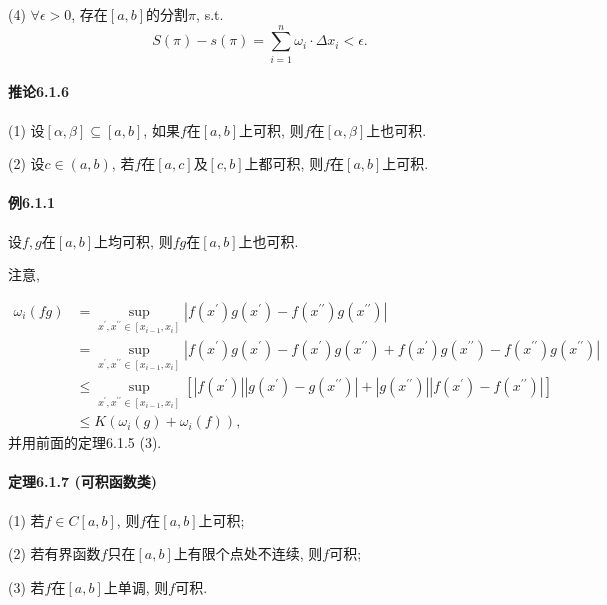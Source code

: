 (4) $\forall\epsilon>0$, 存在$[a,b]$的分割$\pi$, s.t.
\[
S(\pi)-s(\pi)=\sum_{i=1}^{n}\omega_{i}\cdot\Delta x_{i}<\epsilon.
\]


\paragraph{推论6.1.6}

(1) 设$[\alpha,\beta]\subseteq[a,b]$, 如果$f$在$[a,b]$上可积, 则$f$在$[\alpha,\beta]$上也可积.

(2) 设$c\in(a,b)$, 若$f$在$[a,c]$及$[c,b]$上都可积, 则$f$在$[a,b]$上可积.

\paragraph{例6.1.1}

设$f,g$在$[a,b]$上均可积, 则$fg$在$[a,b]$上也可积.

注意,

\[
\begin{aligned}\omega_{i}(fg) & =\sup_{x^{\prime},x^{\prime\prime}\in\left[x_{i-1},x_{i}\right]}\left|f\left(x^{\prime}\right)g\left(x^{\prime}\right)-f\left(x^{\prime\prime}\right)g\left(x^{\prime\prime}\right)\right|\\
 & =\sup_{x^{\prime},x^{\prime\prime}\in\left[x_{i-1},x_{i}\right]}\left|f\left(x^{\prime}\right)g\left(x^{\prime}\right)-f\left(x^{\prime}\right)g\left(x^{\prime\prime}\right)+f\left(x^{\prime}\right)g\left(x^{\prime\prime}\right)-f\left(x^{\prime\prime}\right)g\left(x^{\prime\prime}\right)\right|\\
 & \leqslant\sup_{x^{\prime},x^{\prime\prime}\in\left[x_{i-1},x_{i}\right]}\left[\left|f\left(x^{\prime}\right)\right|\left|g\left(x^{\prime}\right)-g\left(x^{\prime\prime}\right)\right|+\left|g\left(x^{\prime\prime}\right)\right|\left|f\left(x^{\prime}\right)-f\left(x^{\prime\prime}\right)\right|\right]\\
 & \leqslant K\left(\omega_{i}(g)+\omega_{i}(f)\right),
\end{aligned}
\]
并用前面的定理6.1.5 (3).

\paragraph{定理6.1.7 (可积函数类)}

(1) 若$f\in C[a,b]$, 则$f$在$[a,b]$上可积;

(2) 若有界函数$f$只在$[a,b]$上有限个点处不连续, 则$f$可积;

(3) 若$f$在$[a,b]$上单调, 则$f$可积.

